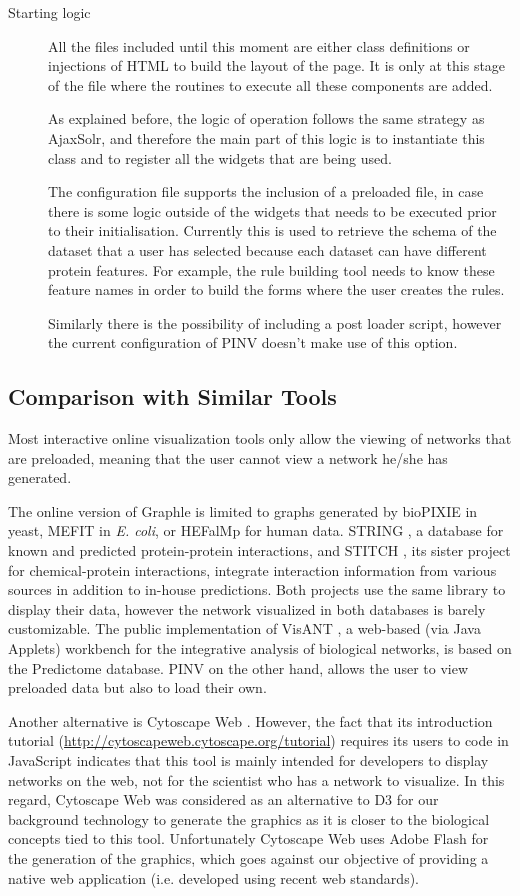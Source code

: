 \begin{description}
\item[Starting logic]
All the files included until this moment are either class definitions or injections of HTML to build the layout of the page. It is only at this stage of the file where the routines to execute all these components are added. 

As explained before, the logic of operation follows the same strategy as AjaxSolr, and therefore the main part of this logic is to instantiate this class and to register all the widgets that are being used.

The configuration file supports the inclusion of a preloaded file, in case there is some logic outside of the widgets that needs to be executed prior to their initialisation. Currently this is used to retrieve the schema of the dataset that a user has selected because each dataset can have different protein features. For example, the rule building tool needs to know these feature names in order to build the forms where the user creates the rules.

Similarly there is the possibility of including a post loader script, however the current configuration of PINV doesn't make use of this option.
\end{description}


\subsection{Comparison with Similar Tools}
Most interactive online visualization tools only allow the viewing of networks that are preloaded, meaning that the user cannot view a network he/she has generated.

The online version of Graphle \cite{HUT2009} is limited to graphs generated by bioPIXIE in yeast, MEFIT in \emph{E. coli}, or HEFalMp for human data. STRING \cite{FRA2013}, a database for known and predicted protein-protein interactions, and STITCH \cite{KUH2008}, its sister project for chemical-protein interactions, integrate interaction information from various sources in addition to in-house predictions. Both projects use the same library to display their data, however the network visualized in both databases is barely customizable. The public implementation of VisANT \cite{HU2013}, a web-based  (via Java Applets) workbench for the integrative analysis of biological networks, is based on the Predictome database.  
PINV on the other hand, allows the user to view preloaded data but also to load their own.

Another alternative is Cytoscape Web \cite{LOP2010}. However, the fact that its introduction tutorial (\url{http://cytoscapeweb.cytoscape.org/tutorial}) requires its users to code in JavaScript indicates that this tool is mainly intended for developers to display networks on the web, not for the scientist who has a network to visualize. In this regard, Cytoscape Web was considered as an alternative to D3 for our background technology to generate the graphics as it is closer to the biological concepts tied to this tool. Unfortunately Cytoscape Web uses Adobe Flash for the generation of the graphics, which goes against our objective of providing a native web application (i.e. developed using recent web standards). 

